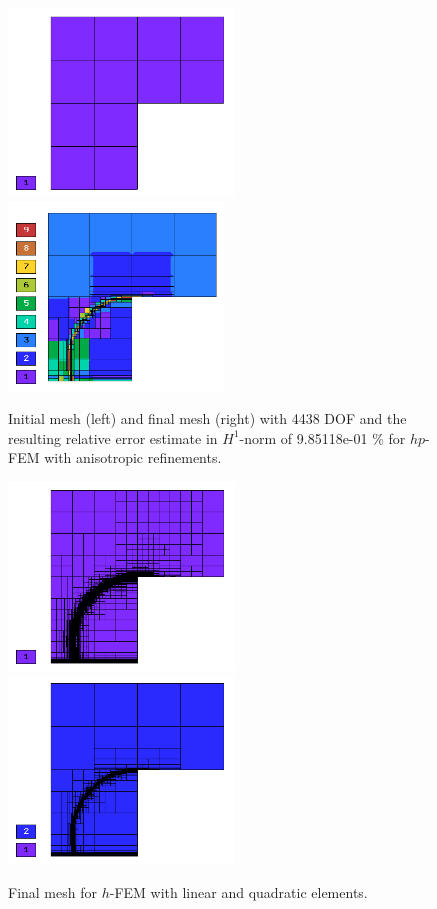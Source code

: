 \begin{figure}[!ht]
\centering
\includegraphics[height=5cm]{nist/nist-12/mesh_hp_aniso_init.png}\ \
\includegraphics[height=5cm]{nist/nist-12/mesh_hp_aniso.png}
\caption{Initial mesh (left) and final mesh (right) with 4438 DOF and the resulting relative error estimate in $H^1$-norm of 9.85118e-01 \% for $hp$-FEM with anisotropic refinements.}
\label{fig:nist-12-hp-aniso}
\end{figure}

\begin{figure}[!ht]
\centering
\includegraphics[height=5cm]{nist/nist-12/mesh_h1_aniso.png}\ \
\includegraphics[height=5cm]{nist/nist-12/mesh_h2_aniso.png}
\caption{Final mesh for $h$-FEM with linear and quadratic elements.}
\label{fig:nist-12-h-aniso}
\end{figure}

